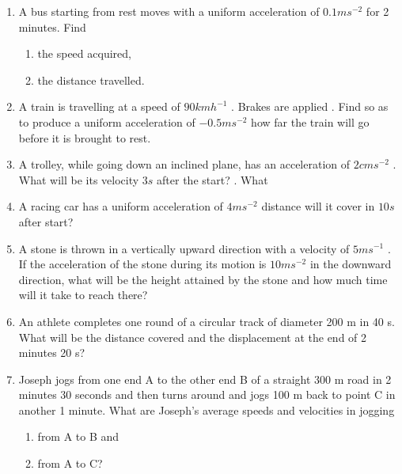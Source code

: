 \renewcommand{\theequation}{\theenumi}
\begin{enumerate}[label=\arabic*.,ref=\thesection.\theenumi]

\item A bus starting from rest moves with a uniform acceleration of $0.1 m s^{-2}$
for 2 minutes. Find 

\begin{enumerate} 
\item the speed acquired, 
\item the distance travelled.
\end{enumerate}

\item A train is travelling at a speed of $90 km h^{-1}$
. Brakes are applied . Find
so as to produce a uniform acceleration of $- 0.5 m s^{-2}$
how far the train will go before it is brought to rest.
\item  A trolley, while going down an inclined plane, has an acceleration of $2 cm s^{-2}$
. What will
be its velocity $3 s$ after the start? . What
\item  A racing car has a uniform acceleration of $4 m s^{-2}$
distance will it cover in $10 s$ after start?
\item  A stone is thrown in a vertically upward direction with a velocity of $5 m s^{-1}$
. If the acceleration of the
stone during its motion is $10 m s^{-2}$ in the downward direction, what will be the height attained by the stone and how much time will it take to reach there?

\item An athlete completes one round of a circular track of diameter 200 m in 40 s. What will be the distance covered and the displacement at the end of 2 minutes 20 s?
\item  Joseph jogs from one end A to the other end B of a straight 300 m road in 2 minutes 30 seconds and then turns around
and jogs 100 m back to point C in another 1 minute. What are Joseph’s average speeds and velocities in jogging 

\begin{enumerate} 
\item from A to B and 
\item from A to C?
\end{enumerate}


\end{enumerate}
